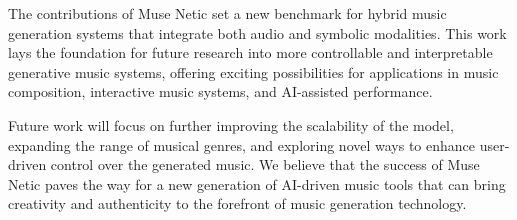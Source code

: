 \documentclass[conference]{IEEEtran}
\begin{document}
The contributions of Muse Netic set a new benchmark for hybrid music generation systems that integrate both audio and symbolic modalities. This work lays the foundation for future research into more controllable and interpretable generative music systems, offering exciting possibilities for applications in music composition, interactive music systems, and AI-assisted performance.

Future work will focus on further improving the scalability of the model, expanding the range of musical genres, and exploring novel ways to enhance user-driven control over the generated music. We believe that the success of Muse Netic paves the way for a new generation of AI-driven music tools that can bring creativity and authenticity to the forefront of music generation technology.




\end{document}
